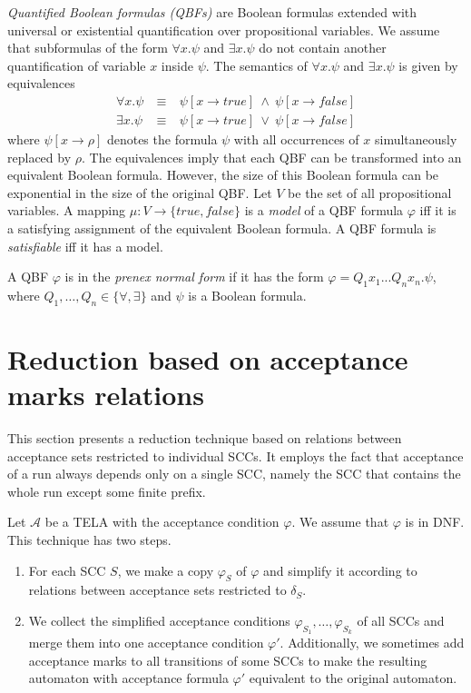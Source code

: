 \documentclass[a4paper,UKenglish,cleveref, autoref, thm-restate]{lipics-v2021}
\def\false{\mathit{false}}
\def\true{\mathit{true}}
\newcommand{\mA}{\mathcal{A}}
\begin{document}
\emph{Quantified Boolean formulas (QBFs)} are Boolean formulas
extended with universal or existential quantification over
propositional variables. We assume that subformulas of the form
$\forall x.\psi$ and $\exists x.\psi$ do not contain another
quantification of variable $x$ inside $\psi$. The semantics of
$\forall x.\psi$ and $\exists x.\psi$ is given by equivalences
\[
  \begin{array}{rcl}
    \forall x.\psi &~\equiv~& \psi[x\rightarrow\true]~\wedge~\psi[x\rightarrow\false]\\
    \exists x.\psi &~\equiv~& \psi[x\rightarrow\true]~\vee~   \psi[x\rightarrow\false]
  \end{array}
\]
where $\psi[x\rightarrow \rho]$ denotes the formula $\psi$ with all
occurrences of $x$ simultaneously replaced by $\rho$. The equivalences
imply that each QBF can be transformed into an equivalent Boolean
formula. However, the size of this Boolean formula can be exponential
in the size of the original QBF. Let $V$ be the set of all
propositional variables. A mapping $\mu:V\rightarrow\{\true,\false\}$
is a \emph{model} of a QBF formula $\varphi$ iff it is a satisfying
assignment of the equivalent Boolean formula. A QBF formula is
\emph{satisfiable} iff it has a model.

A QBF $\varphi$ is in the \emph{prenex normal form} if it has the form
$\varphi = Q_{1}x_{1}...Q_{n}x_{n} . \psi$, where
$Q_1,\ldots,Q_n \in \{\forall, \exists\}$ and $\psi$ is a Boolean
formula.


\section{Reduction based on acceptance marks relations}\label{sec:standard}

This section presents a reduction technique based on relations between
acceptance sets restricted to individual SCCs. It employs the fact
that acceptance of a run always depends only on a single SCC, namely
the SCC that contains the whole run except some finite prefix.

Let $\mA$ be a TELA with the acceptance condition $\varphi$. We assume
that $\varphi$ is in DNF. This technique has two steps.
\begin{enumerate}
\item For each SCC $S$, we make a copy $\varphi_S$ of $\varphi$ and
  simplify it according to relations between acceptance sets
  restricted to $\delta_S$. 
\item We collect the simplified acceptance conditions
  $\varphi_{S_1},\ldots,\varphi_{S_k}$ of all SCCs and merge them into
  one acceptance condition $\varphi'$. Additionally, we sometimes add
  acceptance marks to all transitions of some SCCs to make the
  resulting automaton with acceptance formula $\varphi'$ equivalent to
  the original automaton.
\end{enumerate}
\end{document}
